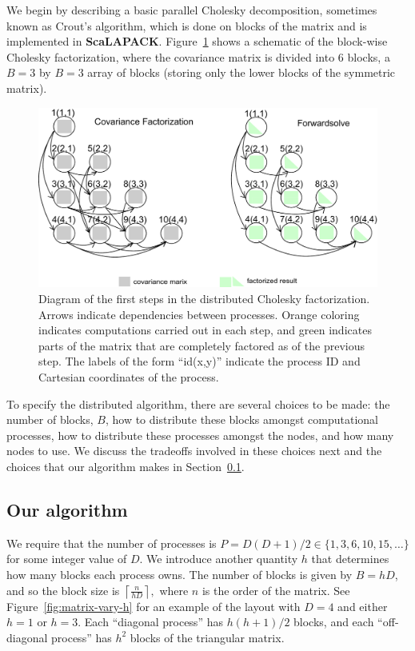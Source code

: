 \documentclass[12pt]{article}
\newcommand{\pkg}[1]{\textbf{#1}}
\begin{document}
We begin by describing a basic parallel Cholesky decomposition, sometimes known as Crout's algorithm, which is done on blocks of the matrix and is implemented in \pkg{ScaLAPACK}. Figure~\ref{fig:dependency-graph} shows a schematic of the block-wise Cholesky factorization, where the covariance matrix is divided into 6 blocks, a $B=3$ by $B=3$ array of blocks (storing only the lower blocks of the symmetric matrix). 

\begin{figure}
 \centering
\includegraphics[scale=.5]{figs/dependency_h}
 \caption{
Diagram of the first steps in the distributed Cholesky factorization.  Arrows indicate dependencies between processes. Orange coloring indicates computations carried out in each step, and green indicates parts of the matrix that are completely factored as of the previous step. The labels of the form ``id(x,y)'' indicate the process ID and Cartesian coordinates of the process.\label{fig:dependency-graph}}
\end{figure}


To specify the distributed algorithm, there are several choices to be made: the number of blocks, \(B\), how to distribute these blocks amongst computational processes, how to distribute these processes amongst the nodes, and how many nodes to use.  We discuss the tradeoffs involved in these choices next and the choices that our algorithm makes in Section~\ref{sec:our-alg}.


\subsection{Our algorithm}
\label{sec:our-alg}


We require that the number of processes is \(P=D(D+1)/2 \in \{1,3,6,10,15,\ldots\}\) for some integer value of \(D\).  We introduce another quantity \(h\) that determines how many blocks each process owns.  The number of blocks is given by \(B=hD\), and so the block size is
$\left\lceil\frac{n}{hD}\right\rceil,$
where \(n\) is the order of the matrix.  See Figure~\ref{fig:matrix-vary-h} for an example of the layout with \(D=4\) and either \(h=1\) or \(h=3\).  Each ``diagonal process'' has \(h(h+1)/2\) blocks, and each ``off-diagonal process'' has \(h^2\) blocks of the triangular matrix.
\end{document}
